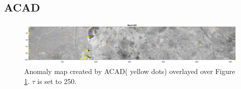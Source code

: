\subsection{ACAD}

\begin{figure}[H]
\centering                                                           

   \includegraphics[scale=0.3]{images/AD_testing/anomaly_map_over_picture_tresh=250.png}
  \caption{Anomaly map created by ACAD( yellow dots) overlayed over Figure \ref{fig:cuprite_scene_band_220}. $\tau$ is set to 250.} 
  \label{fig:cuprite_scene_band_220}
\end{figure}

